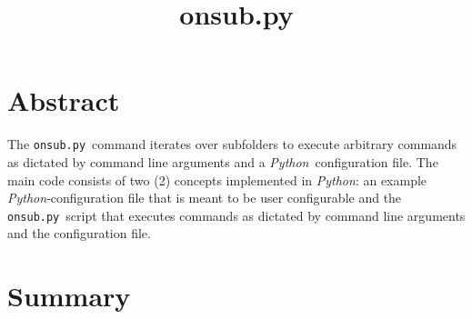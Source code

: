 \newcommand\Python{\emph{Python}}
\newcommand\Git{\emph{Git}}
\newcommand\Mercurial{\emph{Mercurial}}
\newcommand\Subversion{\emph{Subversion}}
\newcommand\git{\lstinline{git}}
\newcommand\hg{\lstinline{hg}}
\newcommand\svn{\lstinline{svn}}
\newcommand\Linux{\emph{Linux}}
\newcommand\Windows{\emph{Windows}}
\newcommand\Mac{\emph{Mac}}
\newcommand\onsubpy{\lstinline{onsub.py}}



\title{onsub.py}



\section*{Abstract}
The \onsubpy\ command iterates over subfolders to execute arbitrary commands as dictated by command line arguments and a \Python\ configuration file. The main code consists of two (2) concepts implemented in \Python: an example \Python-configuration file that is meant to be user configurable and the \onsubpy\ script that executes commands as dictated by command line arguments and the configuration file.

\tableofcontents

\section{Summary}


